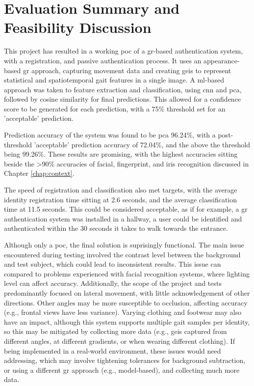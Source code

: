\section{Evaluation Summary and Feasibility Discussion}
\label{sec:project-evaluation}

This project has resulted in a working \ac{poc} of a \ac{gr}-based authentication system, with a registration, and passive authentication process.
It uses an appearance-based \ac{gr} approach, capturing movement data and creating \acp{gei} to represent statistical and spatiotemporal gait features in a single image.
A \ac{ml}-based approach was taken to feature extraction and classification, using \ac{cnn} and \ac{pca}, followed by cosine similarity for final predictions.
This allowed for a confidence score to be generated for each prediction, with a 75\% threshold set for an 'acceptable' prediction.

Prediction accuracy of the system was found to be \ac{pca} 96.24\%, with a post-threshold 'acceptable' prediction accuracy of 72.04\%, and the above the threshold being 99.26\%.
These results are promising, with the highest accuracies sitting beside the >90\% accuracies of facial, fingerprint, and iris recognition discussed in Chapter \ref{chap:context}.

The speed of registration and classification also met targets, with the average identity registration time sitting at 2.6 seconds, and the average classification time at 11.5 seconds.
This could be considered acceptable, as if for example, a \ac{gr} authentication system was installed in a hallway, a user could be identified and authenticated within the 30 seconds it takes to walk towards the entrance.

Although only a \ac{poc}, the final solution is suprisingly functional.
The main issue encountered during testing involved the contrast level between the background and test subject, which could lead to inconsistent results.
This issue can compared to problems experienced with facial recognition systems, where lighting level can affect accuracy.
Additionally, the scope of the project and tests predominantly focused on lateral movement, with little acknowledgement of other directions. 
Other angles may be more susceptible to occlusion, affecting accuracy (e.g., frontal views have less variance).
Varying clothing and footwear may also have an impact, although this system supports multiple gait samples per identity, so this may be mitigated by collecting more data (e.g., \acp{gei} captured from different angles, at different gradients, or when wearing different clothing).
If being implemented in a real-world environment, these issues would need addressing, which may involve tightening tolerances for background subtraction, or using a different \ac{gr} approach (e.g., model-based), and collecting much more data.

